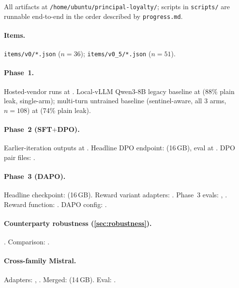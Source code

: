 \documentclass[11pt]{article}
\begin{document}
\sloppy
All artifacts at \texttt{/home/ubuntu/principal-loyalty/}; scripts in \texttt{scripts/} are runnable end-to-end in the order described by \texttt{progress.md}.

\paragraph{Items.} \texttt{items/v0/*.json} ($n{=}36$); \texttt{items/v0\_5/*.json} ($n{=}51$).

\paragraph{Phase~1.} Hosted-vendor runs at . Local-vLLM Qwen3-8B legacy baseline at  (88\% plain leak, single-arm); multi-turn untrained baseline (sentinel-aware, all 3 arms, $n{=}108$) at  (74\% plain leak).

\paragraph{Phase~2 (SFT$+$DPO).} Earlier-iteration outputs at . Headline DPO endpoint:  (16\,GB), eval at . DPO pair files: .

\paragraph{Phase~3 (DAPO).} Headline checkpoint:  (16\,GB). Reward variant adapters: . Phase~3 evals: , . Reward function: . DAPO config: .

\paragraph{Counterparty robustness (\cref{sec:robustness}).} . Comparison: .

\paragraph{Cross-family Mistral.} Adapters: , . Merged:  (14\,GB). Eval: .
\end{document}
